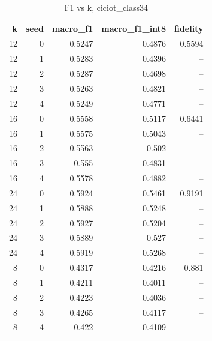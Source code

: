 \begin{table}
\caption{F1 vs k, ciciot_class34}
\begin{tabular}{rrrrr}
\toprule
k & seed & macro_f1 & macro_f1_int8 & fidelity \\
\midrule
12 & 0 & 0.5247 & 0.4876 & 0.5594 \\
12 & 1 & 0.5283 & 0.4396 & -- \\
12 & 2 & 0.5287 & 0.4698 & -- \\
12 & 3 & 0.5263 & 0.4821 & -- \\
12 & 4 & 0.5249 & 0.4771 & -- \\
16 & 0 & 0.5558 & 0.5117 & 0.6441 \\
16 & 1 & 0.5575 & 0.5043 & -- \\
16 & 2 & 0.5563 & 0.502 & -- \\
16 & 3 & 0.555 & 0.4831 & -- \\
16 & 4 & 0.5578 & 0.4882 & -- \\
24 & 0 & 0.5924 & 0.5461 & 0.9191 \\
24 & 1 & 0.5888 & 0.5248 & -- \\
24 & 2 & 0.5927 & 0.5204 & -- \\
24 & 3 & 0.5889 & 0.527 & -- \\
24 & 4 & 0.5919 & 0.5268 & -- \\
8 & 0 & 0.4317 & 0.4216 & 0.881 \\
8 & 1 & 0.4211 & 0.4011 & -- \\
8 & 2 & 0.4223 & 0.4036 & -- \\
8 & 3 & 0.4265 & 0.4117 & -- \\
8 & 4 & 0.422 & 0.4109 & -- \\
\bottomrule
\end{tabular}
\end{table}
